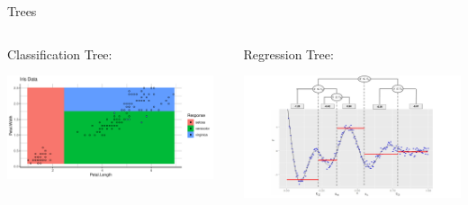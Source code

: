 \begin{frame}[fragile]{Trees}

\lz 

\begin{columns}
\begin{column}{0.5\textwidth}
Classification Tree:
\lz


\begin{knitrout}\scriptsize
{}\color{fgcolor}

{\centering \includegraphics[width=0.95\textwidth]{figure/cart_splitcriteria_1} 

}



\end{knitrout}
 
\end{column}
\begin{column}{0.5\textwidth}
Regression Tree:

\includegraphics[height = 0.4\textheight]{figure_man/CART_reg_example.pdf}

\end{column}
\end{columns}
\end{frame}

